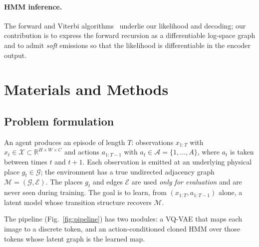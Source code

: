\documentclass[twocolumn,10pt]{article}
\newcommand{\R}{\mathbb{R}}
\begin{document}
\paragraph{HMM inference.}
The forward and Viterbi algorithms~\cite{rabiner1989} underlie our likelihood
and decoding; our contribution is to express the forward recursion as a
differentiable log-space graph and to admit \emph{soft} emissions so that the
likelihood is differentiable in the encoder output.

\section{Materials and Methods}
\label{sec:methods}

\subsection{Problem formulation}
\label{sec:problem}

An agent produces an episode of length $T$: observations
$x_{1:T}$ with $x_t\in\mathcal{X}\subset\R^{H\times W\times C}$ and actions
$a_{1:T-1}$ with $a_t\in\mathcal{A}=\{1,\dots,A\}$, where $a_t$ is taken
between times $t$ and $t{+}1$. Each observation is emitted at an
underlying physical place $g_t\in\mathcal{G}$; the environment has a true
undirected adjacency graph $\mathcal{M}=(\mathcal{G},\mathcal{E})$. The places
$g_t$ and edges $\mathcal{E}$ are used \emph{only for evaluation} and are
never seen during training. The goal is to learn, from $(x_{1:T},a_{1:T-1})$
alone, a latent model whose transition structure recovers $\mathcal{M}$.

The pipeline (Fig.~\ref{fig:pipeline}) has two modules: a VQ-VAE that maps
each image to a discrete token, and an action-conditioned cloned HMM over
those tokens whose latent graph is the learned map.
\end{document}
